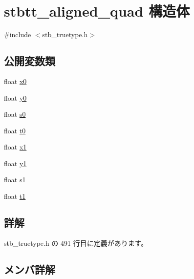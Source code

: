 \hypertarget{structstbtt__aligned__quad}{}\section{stbtt\+\_\+aligned\+\_\+quad 構造体}
\label{structstbtt__aligned__quad}


{\ttfamily \#include $<$stb\+\_\+truetype.\+h$>$}

\subsection*{公開変数類}
\begin{DoxyCompactItemize}
\item 
float \mbox{\hyperlink{structstbtt__aligned__quad_ad74fd8fd69f8a8e1bd20cb0ab7df6e2e}{x0}}
\item 
float \mbox{\hyperlink{structstbtt__aligned__quad_a6178a6b380cf6889893afaeb5019ecd6}{y0}}
\item 
float \mbox{\hyperlink{structstbtt__aligned__quad_ac23b153ff4042deb5499e5a8cacf4a59}{s0}}
\item 
float \mbox{\hyperlink{structstbtt__aligned__quad_a921cd13638a8b3a1e0729021d371da49}{t0}}
\item 
float \mbox{\hyperlink{structstbtt__aligned__quad_a43a7eeac24238e289f825e644331dee6}{x1}}
\item 
float \mbox{\hyperlink{structstbtt__aligned__quad_a66ee8061da982804073a3d2a9114e53c}{y1}}
\item 
float \mbox{\hyperlink{structstbtt__aligned__quad_a26360efee3cdfb5aa2bdc593157b436b}{s1}}
\item 
float \mbox{\hyperlink{structstbtt__aligned__quad_ae1f5ed7333ca5bba46c6a098a05ac75b}{t1}}
\end{DoxyCompactItemize}


\subsection{詳解}


 stb\+\_\+truetype.\+h の 491 行目に定義があります。



\subsection{メンバ詳解}
\mbox{\label{structstbtt__aligned__quad_ac23b153ff4042deb5499e5a8cacf4a59}} 
